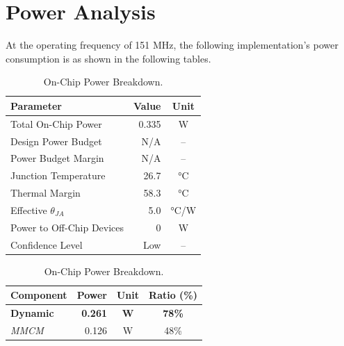 \documentclass[11pt]{article}
\begin{document}
\section*{Power Analysis}

At the operating frequency of 151 MHz, the following implementation's power consumption is as shown in the following tables.

\begin{table}[H]
    \centering 
    \begin{minipage}[b]{0.46\textwidth}
        \flushleft
        \captionsetup{type=table, singlelinecheck=false, justification=raggedright, skip=2pt}
        \caption{Power Analysis Summary.}
        \label{tab:main_power}
        \small
        \begin{tabular}{lrc}
            \toprule
            \textbf{Parameter} & \textbf{Value} & \textbf{Unit} \\
            \midrule
            Total On-Chip Power            & 0.335 & W   \\
            Design Power Budget            & N/A   & --  \\
            Power Budget Margin            & N/A   & --  \\
            Junction Temperature           & 26.7  & °C  \\
            Thermal Margin                 & 58.3  & °C  \\
            Effective $\theta_{JA}$        & 5.0   & °C/W\\
            Power to Off-Chip Devices      & 0     & W   \\
            Confidence Level               & Low   & --  \\
            \bottomrule
        \end{tabular}
    \end{minipage}%
    \hfill 
    \begin{minipage}[b]{0.50\textwidth}
        \flushleft
        \captionsetup{type=table, singlelinecheck=false, justification=raggedright, skip=2pt}
        \caption{On-Chip Power Breakdown.}
        \label{tab:power_dynamic_breakdown}
        \small
        \begin{tabular}{lrcc}
            \toprule
            \textbf{Component} & \textbf{Power} & \textbf{Unit} & \textbf{Ratio (\%)} \\
            \midrule
            \textbf{Dynamic}   & \textbf{0.261} & \textbf{W} & \textbf{78\%} \\
            \quad \textit{MMCM}               & 0.126 & W & 48\% \\

\end{tabular}
\end{minipage}
\end{table}
\end{document}
